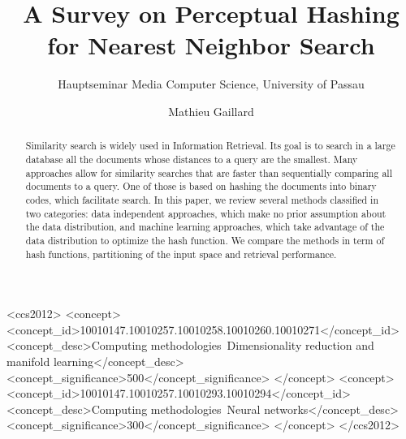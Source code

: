 \documentclass[sigconf]{acmart}
\begin{document}
\title{A Survey on Perceptual Hashing for Nearest Neighbor Search}
\subtitle{Hauptseminar Media Computer Science, University of Passau}

\author{Mathieu Gaillard}

\begin{abstract}
Similarity search is widely used in Information Retrieval. Its goal is to search in a large database all the documents whose distances to a query are the smallest. Many approaches allow for similarity searches that are faster than sequentially comparing all documents to a query. One of those is based on hashing the documents into binary codes, which facilitate search. In this paper, we review several methods classified in two categories: data independent approaches, which make no prior assumption about the data distribution, and machine learning approaches, which take advantage of the data distribution to optimize the hash function. We compare the methods in term of hash functions, partitioning of the input space and retrieval performance.
\end{abstract}

%
%
\begin{CCSXML}
<ccs2012>
	<concept>
		<concept_id>10010147.10010257.10010258.10010260.10010271</concept_id>
		<concept_desc>Computing methodologies~Dimensionality reduction and manifold learning</concept_desc>
		<concept_significance>500</concept_significance>
	</concept>
	<concept>
		<concept_id>10010147.10010257.10010293.10010294</concept_id>
		<concept_desc>Computing methodologies~Neural networks</concept_desc>
		<concept_significance>300</concept_significance>
	</concept>
</ccs2012>
\end{CCSXML}



\maketitle




 
\end{document}
